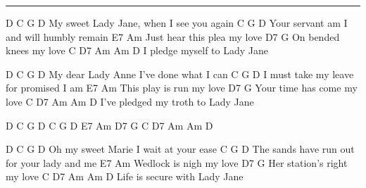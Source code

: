 \noindent\rule{\columnwidth}{1pt}

\begin{lstsong}
   D          C                     G   D
My sweet Lady Jane, when I see you again
                C                   G   D
Your servant am I and will humbly remain
E7             Am
Just hear this plea my love
D7        G
On bended knees my love
C          D7           Am   Am D
I pledge myself to Lady Jane
 
   D         C                     G  D
My dear Lady Anne I've done what I can
               C                    G  D
I must take my leave for promised I am
E7           Am
This play is run my love
D7            G
Your time has come my love
C               D7            Am  Am D
I've pledged my troth to Lady Jane

D C G D C G D E7 Am D7 G C D7 Am  Am D

      D       C                  G  D
Oh my sweet Marie I wait at your ease
                   C                     G D
The sands have run out for your lady and me
E7         Am
Wedlock is nigh my love
D7            G
Her station's right my love
C         D7             Am   Am D    
Life is secure with Lady Jane
\end{lstsong}
\newpage


\begin{comment}
    D              C
     My sweet Lady Jane
                      G
     when I see you again
    D                C
     Yoyr servant am I
                        G   D
     And will humbly remain
    E7           Am
     Just heed this plea, my love
    D7           G
     On bended knees my love,
    C            D7           Am  D
     I pledge myself to Lady Jane.

     My dear Lady Anne
     I've done what I can.
     I must take my leave
     for promised I am.
     This play is run, my love.
     Your time has come my love.
     I've pledge my troth to Lady Jane.

Oh, my sweet Marie,
     I wait at your ease
     The sands have run out.
     For your Lady and me.
     Wedlock is nigh, my love,
     Her station's right, my love,
     Life is secure with Lady Jane.
\end{comment}

